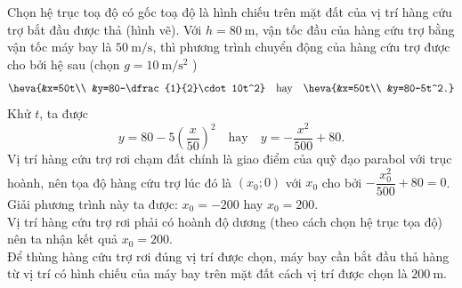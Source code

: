 \begin{ex}
{\begin{center}
\begin{tikzpicture}[font=\footnotesize, line join=round, line cap=round, >=stealth]
				\end{tikzpicture}
		\end{center}
		Chọn hệ trục toạ độ có gốc toạ độ là hình chiếu trên mặt đất của vị trí hàng cứu trợ bắt đầu được thả (hình vẽ). Với $h=80 \mathrm{~m}$, vận tốc đầu của hàng cứu trợ bằng vận tốc máy bay là $50 \mathrm{~m} / \mathrm{s}$, thì phương trình chuyển động của hàng cứu trợ được cho bởi hệ sau (chọn $g=10 \mathrm{~m} / \mathrm{s}^{2}$ )
		\[\heva{&x=50t\\ &y=80-\dfrac{1}{2}\cdot 10t^2} \quad\text{hay}\quad \heva{&x=50t\\ &y=80-5t^2.}\]
		Khử $t$, ta được
		$$
		y=80-5\left(\dfrac{x}{50}\right)^{2} \quad\text {hay}\quad y=-\dfrac{x^{2}}{500}+80.
		$$
		Vị trí hàng cứu trợ rơi chạm đất chính là giao điểm của quỹ đạo parabol với trục hoành, nên tọa độ hàng cứu trợ lúc đó là $\left(x_{0} ; 0\right)$ với $x_{0}$ cho bởi $-\dfrac{x_0^2}{500}+80=0$. Giải phương trình này ta được: $x_{0}=-200$ hay $x_{0}=200$.\\
		Vị trí hàng cứu trợ rơi phải có hoành độ dương (theo cách chọn hệ trục tọa độ) nên ta nhận kết quả $x_{0}=200$.\\
		Để thùng hàng cứu trợ rơi đúng vị trí được chọn, máy bay cần bắt đầu thả hàng từ vị trí có hình chiếu của máy bay trên mặt đất cách vị trí được chọn là $200 \mathrm{~m}$.
	}
\end{ex}
